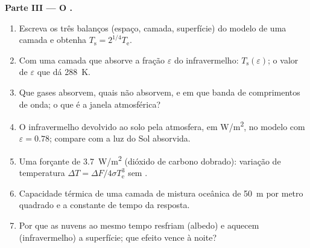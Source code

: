 \begin{problem}
\textbf{Parte III --- O .}
\begin{enumerate}[resume]
  \item Escreva os três balanços (espaço, camada, superfície) do
        modelo de uma camada e obtenha $T_{\text{s}} = 2^{1/4}T_{\text{e}}$.
  \item Com uma camada que absorve a fração $\varepsilon$ do
        infravermelho: $T_{\text{s}}(\varepsilon)$; o valor de $\varepsilon$
        que dá \qty{288}{K}.
  \item Que gases absorvem, quais não absorvem, e em que banda de
        comprimentos de onda; o que é a janela atmosférica?
  \item O infravermelho devolvido ao solo pela atmosfera,
        em \unit{W/m^2}, no modelo com $\varepsilon = 0.78$; compare com
        a luz do Sol absorvida.
  \item Uma forçante de \qty{3.7}{W/m^2} (dióxido de carbono dobrado):
        variação de temperatura $\Delta T = \Delta F/4\sigma T_{\text{e}}^3$
        sem .
  \item Capacidade térmica de uma camada de mistura oceânica de \qty{50}{m} por metro
        quadrado e a constante de tempo da resposta.
  \item Por que as nuvens ao mesmo tempo resfriam (albedo) e aquecem (infravermelho) a
        superfície; que efeito vence à noite?
\end{enumerate}


\end{problem}
